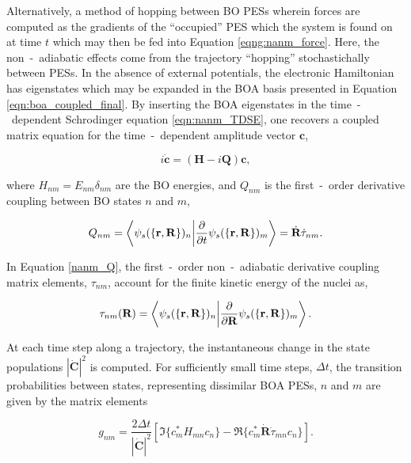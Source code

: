 Alternatively, a method of hopping between BO PESs wherein forces are computed as the gradients of the ``occupied'' PES which the system is found on at time $t$ which may then be fed into Equation \ref{eqng:nanm_force}. Here, the non~-~adiabatic effects come from the trajectory ``hopping'' stochastichally between PESs. In the absence of external potentials, the electronic Hamiltonian has eigenstates which may be expanded in the BOA basis presented in Equation \ref{eqn:boa_coupled_final}. By inserting the BOA eigenstates in the time~-~dependent Schrodinger equation \ref{eqn:nanm_TDSE}, one recovers a coupled matrix equation for the time~-~dependent amplitude vector $\textbf{c}$,

\begin{equation}
    i \dot{\textbf{c}} = \left( \textbf{H} -i\textbf{Q} \right)\textbf{c},
    \label{eqn:nanm_matrix}
\end{equation}

where $H_{nm} = E_{nm}\delta_{nm}$ are the BO energies, and $Q_{nm}$ is the first~-~order derivative coupling between BO states $n$ and $m$,

\begin{equation}
    Q_{nm} = \braket{\psi_{s}(\{ \mathbf{r}, \mathbf{R} \}) _{n}}{\frac{\partial}{\partial t} \psi_{s}(\{ \mathbf{r}, \mathbf{R} \}) _{m}} = \dot{\textbf{R}} \dot \tau_{nm}.
    \label{eqn:nanm_Q}
\end{equation}

In Equation \ref{nanm_Q}, the first~-~order non~-~adiabatic derivative coupling matrix elements, $\tau_{nm}$, account for the finite kinetic energy of the nuclei as,

\begin{equation}
    \tau_{nm}(\textbf{R}) = \braket{\psi_{s}(\{ \mathbf{r}, \mathbf{R} \}) _{n}}{\frac{\partial}{\partial \textbf{R}} \psi_{s}(\{ \mathbf{r}, \mathbf{R} \}) _{m}}.
    \label{eqn:nanm_Tau}
\end{equation}

At each time step along a trajectory, the instantaneous change in the state populations $|\dot{\textbf{C}}|^{2}$ is computed. For sufficiently small time steps, $\Delta t$, the transition probabilities between states, representing dissimilar BOA PESs, $n$ and $m$ are given by the matrix elements

\begin{equation}
    g_{nm} = \frac{2\Delta t}{|\dot{\textbf{C}}|^{2}} \left[ \Im \lbrace c_{m}^{*} H_{mn} c_{n} \rbrace - \Re \lbrace c_{m}^{*} \dot{\textbf{R}}\dot \tau_{mn} c_{n} \rbrace \right].
\end{equation}

